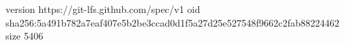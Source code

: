 version https://git-lfs.github.com/spec/v1
oid sha256:5a491b782a7eaf407e5b2be3ccad0d1f5a27d25e527548f9662c2fab88224462
size 5406
